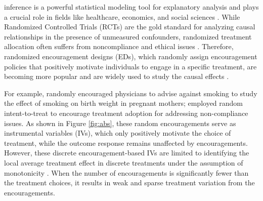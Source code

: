 \documentclass[journal]{IEEEtran}
\begin{document}
 inference is a powerful statistical modeling tool for explanatory analysis and plays a crucial role in fields like healthcare, economics, and social sciences \cite{angrist1996identification,imbens2015causal,burgess2017review,shalit2017estimating,yao2021survey, wooldridge2016introductory, devriendt2020learning, kuang2020data}. 
While Randomized Controlled Trials (RCTs) are the gold standard for analyzing causal relationships in the presence of unmeasured confounders, randomized treatment allocation often suffers from noncompliance and ethical issues \cite{ kohavi2011unexpected,bottou2013counterfactual,wu2022learning}.
Therefore, randomized encouragement designs (EDs), which randomly assign encouragement policies that positively motivate individuals to engage in a specific treatment, are becoming more popular \cite{small2008war,west2008alternatives} and are widely used to study the causal effects \cite{holland1988causal,small2007sensitivity,kang2016peer}. 

For example, \cite{sexton1984clinical, permutt1989simultaneous} randomly encouraged physicians to advise against smoking to study the effect of smoking on birth weight in pregnant mothers; \cite{angrist1996identification,bang2007estimating,kang2016peer} employed random intent-to-treat to encourage treatment adoption for addressing non-compliance issues. As shown in Figure \ref{fig:abs}, these random encouragements serve as instrumental variables (IVs), which only positively motivate the choice of treatment, while the outcome response remains unaffected by encouragements. However, these discrete encouragement-based IVs are limited to identifying the local average treatment effect in discrete treatments under the assumption of monotonicity \cite{angrist1996identification,pearl2010causal,wooldridge2016introductory}. When the number of encouragements is significantly fewer than the treatment choices, it results in weak and sparse treatment variation from the encouragements. 
\end{document}
